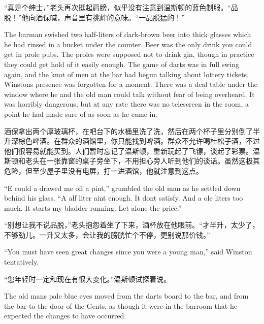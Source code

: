 \begin{paracol}{2}
\switchcolumn

``真是个绅士，''老头再次挺起肩膀，似乎没有注意到温斯顿的蓝色制服。``品脱！''他向酒保喊，声音里有挑衅的意味。``一品脱猛的！''

\switchcolumn*

The barman swished two half-liters of dark-brown beer into thick glasses
which he had rinsed in a bucket under the counter. Beer was the only
drink you could get in prole pubs. The proles were supposed not to drink
gin, though in practice they could get hold of it easily enough. The
game of darts was in full swing again, and the knot of men at the bar
had begun talking about lottery tickets. Winston\textquotesingle s
presence was forgotten for a moment. There was a deal table under the
window where he and the old man could talk without fear of being
overheard. It was horribly dangerous, but at any rate there was no
telescreen in the room, a point he had made sure of as soon as he came
in.

\switchcolumn

酒保拿出两个厚玻璃杯，在吧台下的水桶里洗了洗，然后在两个杯子里分别倒了半升深棕色啤酒。在群众的酒馆里，你只能找到啤酒。群众不允许喝杜松子酒，不过他们很容易就能买到。人们暂时忘记了温斯顿，重新玩起了飞镖，谈起了彩票。温斯顿和老头在一张靠窗的桌子旁坐下，不用担心旁人听到他们的谈话。虽然这极其危险，但至少屋子里没有电屏，打一进酒馆，他就注意到这点。

\switchcolumn*

``\textquotesingle E could \textquotesingle a drawed me off a pint,''
grumbled the old man as he settled down behind his glass. ``A
\textquotesingle alf liter ain\textquotesingle t enough. It
don\textquotesingle t satisfy. And a \textquotesingle ole
liter\textquotesingle s too much. It starts my bladder running. Let
alone the price.''

\switchcolumn

``别想让我不说品脱，''老头抱怨着坐了下来，酒杯放在他眼前。``才半升，太少了，不够劲儿。一升又太多，会让我的膀胱忙个不停，更别说那价钱。''

\switchcolumn*

``You must have seen great changes since you were a young man,'' said
Winston tentatively.

\switchcolumn

``您年轻时一定和现在有很大变化。''温斯顿试探着说。

\switchcolumn*

The old man\textquotesingle s pale blue eyes moved from the darts board
to the bar, and from the bar to the door of the Gents, as though it were
in the barroom that he expected the changes to have occurred.


\end{paracol}
